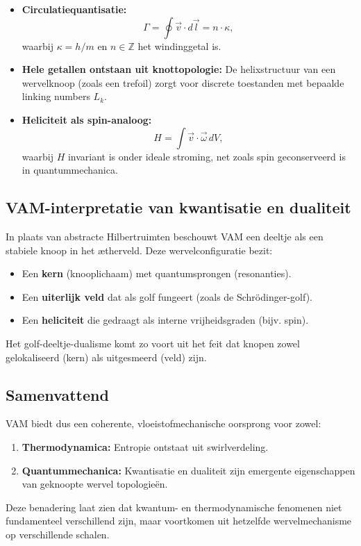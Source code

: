 \begin{itemize}
    \item \textbf{Circulatiequantisatie:}
    \begin{equation}
    \Gamma = \oint \vec{v} \cdot d\vec{l} = n \cdot \kappa,
    \end{equation}
    waarbij $\kappa = h/m$ en $n \in \mathbb{Z}$ het windinggetal is.
    \item \textbf{Hele getallen ontstaan uit knottopologie:} De helixstructuur van een wervelknoop (zoals een trefoil) zorgt voor discrete toestanden met bepaalde linking numbers $L_k$.
    \item \textbf{Heliciteit als spin-analoog:}
    \begin{equation}
    H = \int \vec{v} \cdot \vec{\omega} \, dV,
    \end{equation}
    waarbij $H$ invariant is onder ideale stroming, net zoals spin geconserveerd is in quantummechanica.
\end{itemize}

\subsection{VAM-interpretatie van kwantisatie en dualiteit}

In plaats van abstracte Hilbertruimten beschouwt VAM een deeltje als een stabiele knoop in het ætherveld. Deze wervelconfiguratie bezit:

\begin{itemize}
    \item Een \textbf{kern} (knooplichaam) met quantumsprongen (resonanties).
    \item Een \textbf{uiterlijk veld} dat als golf fungeert (zoals de Schrödinger-golf).
    \item Een \textbf{heliciteit} die gedraagt als interne vrijheidsgraden (bijv. spin).
\end{itemize}

Het golf-deeltje-dualisme komt zo voort uit het feit dat knopen zowel gelokaliseerd (kern) als uitgesmeerd (veld) zijn.

\subsection{Samenvattend}

VAM biedt dus een coherente, vloeistofmechanische oorsprong voor zowel:

\begin{enumerate}
    \item \textbf{Thermodynamica:} Entropie ontstaat uit swirlverdeling.
    \item \textbf{Quantummechanica:} Kwantisatie en dualiteit zijn emergente eigenschappen van geknoopte wervel topologieën.
\end{enumerate}

Deze benadering laat zien dat kwantum- en thermodynamische fenomenen niet fundamenteel verschillend zijn, maar voortkomen uit hetzelfde wervelmechanisme op verschillende schalen.

